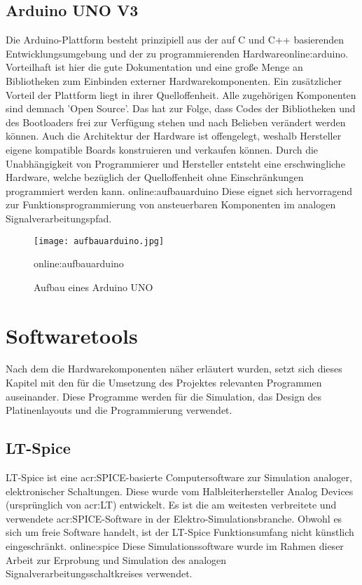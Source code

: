 \subsection{Arduino UNO V3}
\label{subsec:unov3}

Die Arduino-Plattform besteht prinzipiell aus der auf C und C++ basierenden Entwicklungsumgebung und der zu programmierenden Hardware\gls{online:arduino}. Vorteilhaft ist hier die gute Dokumentation und eine große Menge an Bibliotheken zum Einbinden externer Hardwarekomponenten. Ein zusätzlicher Vorteil der Plattform liegt in ihrer Quelloffenheit. Alle zugehörigen Komponenten sind demnach 'Open Source'. Das hat zur Folge, dass Codes der Bibliotheken und des Bootloaders frei zur Verfügung stehen und nach Belieben verändert werden können. Auch die Architektur der Hardware ist offengelegt, weshalb Hersteller eigene kompatible Boards konstruieren und verkaufen können. Durch die Unabhängigkeit von Programmierer und Hersteller entsteht eine erschwingliche Hardware, welche bezüglich der Quelloffenheit ohne Einschränkungen programmiert werden kann.\cite{arduino} \gls{online:aufbauarduino} Diese eignet sich hervorragend zur Funktionsprogrammierung von ansteuerbaren Komponenten im analogen Signalverarbeitungspfad.

\begin{figure}[H]
	\centering
	\texttt{[image: aufbauarduino.jpg]}
	\caption[Aufbau eines Arduino UNO]{Aufbau eines Arduino UNO} 
	\gls{online:aufbauarduino}
	\label{fig:aufbauarduino}
	\end{figure}
\newpage
\section{Softwaretools}       
Nach dem die Hardwarekomponenten näher erläutert wurden, setzt sich dieses Kapitel mit den für die Umsetzung des Projektes relevanten Programmen auseinander. Diese Programme werden für die Simulation, das Design des Platinenlayouts und die Programmierung verwendet. 
 
\subsection{LT-Spice}
\label{subsec:lts}
LT-Spice ist eine \gls{acr:SPICE}-basierte Computersoftware zur Simulation analoger, elektronischer Schaltungen. Diese wurde vom Halbleiterhersteller Analog Devices (ursprünglich von \gls{acr:LT}) entwickelt. Es ist die am weitesten verbreitete und verwendete \gls{acr:SPICE}-Software in der Elektro-Simulationsbranche. Obwohl es sich um freie Software handelt, ist der LT-Spice Funktionsumfang nicht künstlich eingeschränkt. \gls{online:spice} Diese Simulationssoftware wurde im Rahmen dieser Arbeit zur Erprobung und Simulation des analogen Signalverarbeitungsschaltkreises verwendet.

